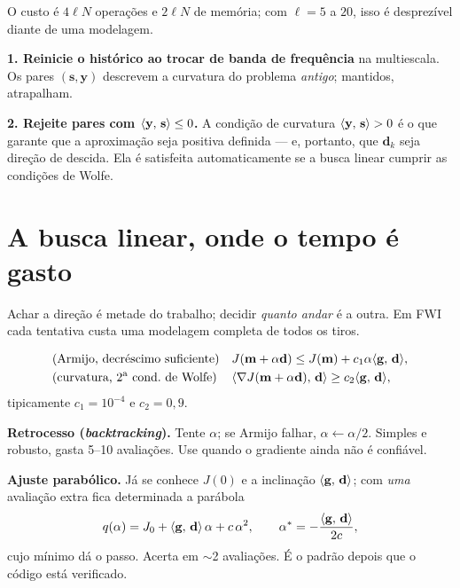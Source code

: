 \documentclass[11pt,a4paper,oneside]{report}
\begin{document}
O custo \'e $4\ell N$ opera\c{c}\~oes e $2\ell N$ de mem\'oria; com
$\ell = 5$ a $20$, isso \'e desprez\'ivel diante de uma modelagem.

\begin{atencao}
\textbf{1. Reinicie o hist\'orico ao trocar de banda de frequ\^encia} na
multiescala. Os pares $(\mathbf{s},\mathbf{y})$ descrevem a curvatura do
problema \emph{antigo}; mantidos, atrapalham.

\textbf{2. Rejeite pares com $\langle \mathbf{y},\,\mathbf{s}\rangle \le 0$.} A
condi\c{c}\~ao de curvatura $\langle \mathbf{y},\,\mathbf{s}\rangle > 0$ \'e o que
garante que a aproxima\c{c}\~ao seja positiva definida --- e, portanto, que
$\mathbf{d}_k$ seja dire\c{c}\~ao de descida. Ela \'e satisfeita
automaticamente se a busca linear cumprir as condi\c{c}\~oes de Wolfe.
\end{atencao}

\section{A busca linear, onde o tempo \'e gasto}

Achar a dire\c{c}\~ao \'e metade do trabalho; decidir \emph{quanto andar} \'e
a outra. Em FWI cada tentativa custa uma modelagem completa de todos os tiros.

\begin{align}
&\text{(Armijo, decr\'escimo suficiente)}
&& J(\mathbf{m} + \alpha\mathbf{d}) \le J(\mathbf{m})
 + c_1\alpha\langle \mathbf{g},\,\mathbf{d}\rangle, \\
&\text{(curvatura, 2\textsuperscript{a} cond.\ de Wolfe)}
&& \langle \nabla J(\mathbf{m}+\alpha\mathbf{d}),\,\mathbf{d}\rangle
 \ge c_2\langle \mathbf{g},\,\mathbf{d}\rangle,
\end{align}
tipicamente $c_1 = 10^{-4}$ e $c_2 = 0{,}9$.

\begin{pratica}
\textbf{Retrocesso (\emph{backtracking}).} Tente $\alpha$; se Armijo falhar,
$\alpha \leftarrow \alpha/2$. Simples e robusto, gasta 5--10 avalia\c{c}\~oes.
Use quando o gradiente ainda n\~ao \'e confi\'avel.

\textbf{Ajuste parab\'olico.} J\'a se conhece $J(0)$ e a inclina\c{c}\~ao
$\langle \mathbf{g},\,\mathbf{d}\rangle$; com \emph{uma} avalia\c{c}\~ao extra fica
determinada a par\'abola
\[
q(\alpha) = J_0 + \langle \mathbf{g},\,\mathbf{d}\rangle\,\alpha + c\,\alpha^{2},
\qquad
\alpha^{*} = -\frac{\langle \mathbf{g},\,\mathbf{d}\rangle}{2c},
\]
cujo m\'inimo d\'a o passo. Acerta em $\sim$2 avalia\c{c}\~oes. \'E o padr\~ao
depois que o c\'odigo est\'a verificado.
\end{pratica}
\end{document}
